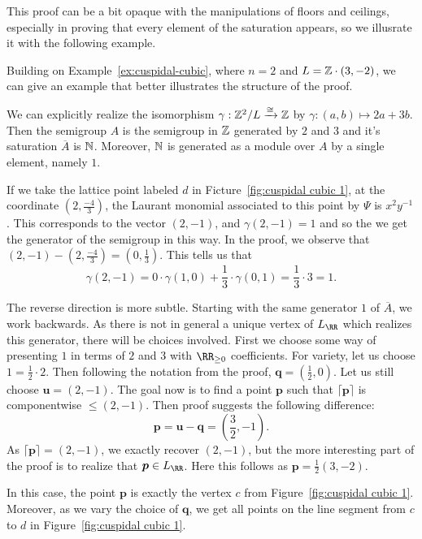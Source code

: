 \documentclass{amsart}
\begin{document}
This proof can be a bit opaque with the manipulations of floors and ceilings, especially in proving that every element of the saturation appears, so we illusrate it with the following example.
  
\begin{example}
  Building on Example~\ref{ex:cuspidal-cubic}, where $n=2$ and $L=\mathbb Z\cdot (3,-2)$, we can give an example that better illustrates the structure of the proof.

  We can explicitly realize the isomorphism $\gamma:\mathbb Z^2/L\xrightarrow{\cong} \mathbb Z$ by $\gamma:(a,b)\mapsto 2a+3b$. Then the semigroup $A$ is the semigroup in $\mathbb Z$ generated by $2$ and $3$ and it's saturation $\overline{A}$ is $\mathbb N$. Moreover, $\mathbb N$ is generated as a module over $A$ by a single element, namely $1$.

  If we take the lattice point labeled $d$ in Ficture~\ref{fig:cuspidal cubic 1}, at the coordinate $(2,\frac{-4}{3})$, the Laurant monomial associated to this point by $\Psi$ is $x^2y^{-1}$.
  This corresponds to the vector $(2,-1)$, and $\gamma(2,-1)=1$ and so the we get the generator of the semigroup in this way.
  In the proof, we observe that $(2,-1)-(2,\frac{-4}{3})=(0,\frac{1}{3})$. This tells us that
  \[\gamma(2,-1) = 0\cdot \gamma(1,0) + \frac{1}{3}\cdot \gamma(0,1)=\frac{1}{3}\cdot 3 = 1.\]

  The reverse direction is more subtle. Starting with the same generator $1$ of $\overline{A}$, we work backwards. As there is not in general a unique vertex of $L_{\RR}$ which realizes this generator, there will be choices involved.
  First we choose some way of presenting $1$ in terms of $2$ and $3$ with $\RR_{\geq 0}$ coefficients. For variety, let us choose $1=\frac{1}{2}\cdot 2$.
  Then following the notation from the proof, $\mathbf{q}=(\frac{1}{2},0)$. Let us still choose $\bm{u}=(2,-1)$.
  The goal now is to find a point $\bm{p}$ such that $\lceil \bm{p} \rceil$ is componentwise $\leq (2,-1)$.
  Then proof suggests the following difference:
  \[\bm{p}=\bm{u}-\bm{q} = (\frac{3}{2},-1).\]
  As $\lceil \bm{p} \rceil = (2,-1)$, we exactly recover $(2,-1)$, but the more interesting part of the proof is to realize that $\bm{p}\in L_{\RR}$. Here this follows as $\bm{p}=\frac{1}{2}(3,-2)$.

  In this case, the point $\bm{p}$ is exactly the vertex $c$ from Figure~\ref{fig:cuspidal cubic 1}. Moreover, as we vary the choice of $\bm{q}$, we get all points on the line segment from $c$ to $d$ in Figure~\ref{fig:cuspidal cubic 1}. 
\end{example}
\end{document}
